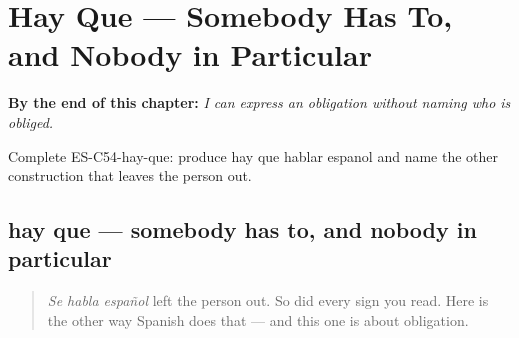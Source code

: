 
\chapter{Hay Que --- Somebody Has To, and Nobody in Particular}
\label{ch:hay-que}

\begin{chapteropening}
\textbf{By the end of this chapter:} \emph{I can express an obligation without naming who is obliged.}

Complete ES-C54-hay-que: produce hay que hablar espanol and name the other construction that leaves the person out.
\end{chapteropening}

\section[hay que]{hay que — somebody has to, and nobody in particular}

\label{lesson:ES-C54-hay-que}



\begin{quote}
\emph{Se habla español} left the person out. So did every sign you read. Here is the other way Spanish does that — and this one is about obligation.
\end{quote}

